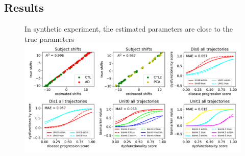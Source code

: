 \documentclass[portrait,a0,final,20pt]{a0poster}
\newcommand{\fnt}[1]{\LARGE{#1}}
\begin{document}
{\begin{multicols}{2}
% 
% 
% 



\section*{Results}


\begin{figure}[H]
\fnt{In synthetic experiment, the estimated parameters are close to the true parameters}\\
\includegraphics[width=\columnwidth]{../figures/compTrueParams105_synth1_JMD.pdf}
  \label{fig:dktSynthTrajCompTrue}
\end{figure}


\end{multicols}}
\end{document}
